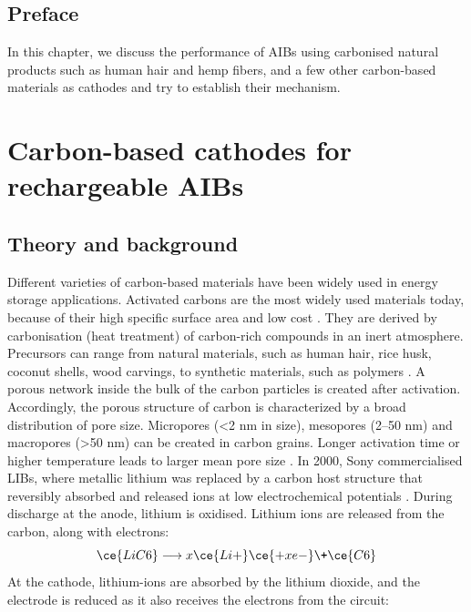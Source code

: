 \section*{Preface}
In this chapter, we discuss the performance of AIBs using carbonised natural products such as human hair and hemp fibers, and a few other carbon-based materials as cathodes and try to establish their mechanism.
\pagebreak
\chapter{Carbon-based cathodes for rechargeable AIBs} %

\label{chap5} %

\section{Theory and background}
Different varieties of carbon-based materials have been widely used in energy storage applications. Activated carbons are the most widely used materials today, because of their high specific surface area and low cost \cite{wang_review_2012}. They are derived by carbonisation (heat treatment) of carbon-rich compounds in an inert atmosphere. Precursors can range from natural materials, such as human hair, rice husk, coconut shells, wood carvings, to synthetic materials, such as polymers \cite{hulicovajurcakova_combined_2009,si_tunable_2013,yalcin_studies_2000,barton_tailored_1999}                                 . A porous network inside the bulk of the carbon particles is created after activation. Accordingly, the porous structure of carbon is characterized by a broad distribution of pore size. Micropores (<2 nm in size), mesopores (2–50 nm) and macropores (>50 nm) can be created in carbon grains. Longer activation time or higher temperature leads to larger mean pore size \cite{simon_materials_2008}. In 2000, Sony commercialised LIBs, where metallic lithium was replaced by a carbon host structure that reversibly absorbed and released  ions at low electrochemical potentials \cite{ozawa_lithium-ion_1994}.
During discharge at the anode, lithium is oxidised. Lithium ions are released from the carbon, along with electrons:
\begin{equation}
\ce{LiC6} \longrightarrow x\ce{Li+} \ce{+xe-} \+ \ce{C6}
\end{equation}
At the cathode, lithium-ions are absorbed by the lithium dioxide, and the electrode is reduced as it also receives the electrons from the circuit:
